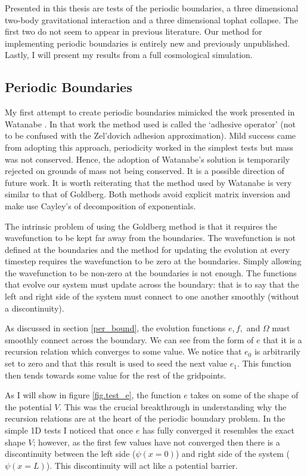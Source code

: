 Presented in this thesis are tests of the periodic boundaries, a three dimensional two-body gravitational interaction and a three dimensional tophat collapse. The first two do not seem to appear in previous literature. Our method for implementing periodic boundaries is entirely new and previously unpublished. Lastly, I will present my results from a full cosmological simulation.

\subsection{Periodic Boundaries}
\label{per_bou}
My first attempt to create periodic boundaries mimicked the work presented in Watanabe \citep{bib_wat}. In that work the method used is called the `adhesive operator' (not to be confused with the Zel'dovich adhesion approximation). Mild success came from adopting this approach, periodicity worked in the simplest tests but mass was not conserved. Hence, the adoption of Watanabe's solution is temporarily rejected on grounds of mass not being conserved. It is a possible direction of future work. It is worth reiterating that the method used by Watanabe is very similar to that of Goldberg. Both methods avoid explicit matrix inversion and make use Cayley's of decomposition of exponentials.

The intrinsic problem of using the Goldberg method is that it requires the wavefunction to be kept far away from the boundaries. The wavefunction is not defined at the boundaries and the method for updating the evolution at every timestep requires the wavefunction to be zero at the boundaries. Simply allowing the wavefunction to be non-zero at the boundaries is not enough. The functions that evolve our system must update across the boundary: that is to say that the left and right side of the system must connect to one another smoothly (without a discontinuity). 

As discussed in section \ref{per_bound}, the evolution functions $e,f,$ and $\Omega$ must smoothly connect across the boundary. We can see from the form of $e$ that it is a recursion relation which converges to some value. We notice that $e_0$ is arbitrarily set to zero and that this result is used to seed the next value $e_1$. This function then tends towards some value for the rest of the gridpoints.

As I will show in figure \ref{fig.test_e}, the function $e$ takes on some of the shape of the potential $V$. This was the crucial breakthrough in understanding why the recursion relations are at the heart of the periodic boundary problem. In the simple 1D tests I noticed that once $e$ has fully converged it resembles the exact shape $V$; however, as the first few values have not converged then there is a discontinuity between the left side ($\psi(x=0)$) and right side of the system ($\psi(x=L)$). This discontinuity will act like a potential barrier.

